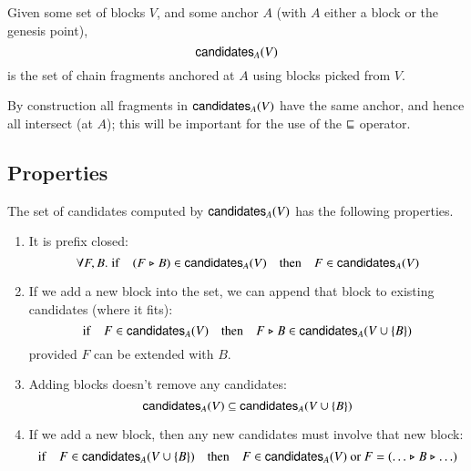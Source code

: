 \begin{definition}
Given some set of blocks $V$, and some anchor $A$ (with $A$ either a block or
the genesis point), $$\mathsf{candidates}_A(V)$$ is the set of chain fragments
anchored at $A$ using blocks picked from $V$.
\end{definition}

By construction all fragments in $\mathsf{candidates}_A(V)$ have the same anchor, and
hence all intersect (at $A$); this will be important for the use of the
$\mathrel{\sqsubseteq}$ operator.

\subsection{Properties}

\begin{lemma}
\label{candidates:properties}
The set of candidates computed by $\mathsf{candidates}_A(V)$ has the following
properties.

\begin{enumerate}

\item \label{candidates:prefixclosed}
It is prefix closed:
\begin{equation*}
\forall F, B .\;
\mathrm{if} \quad (F \mathrel{\triangleright} B) \in \mathsf{candidates}_A(V) \quad \mathrm{then} \quad F \in \mathsf{candidates}_A(V)
\end{equation*}

\item \label{candidates:appendnew}
If we add a new block into the set, we can append that block to existing
candidates (where it fits):
\begin{equation*}
\mathrm{if} \quad F \in \mathsf{candidates}_A(V) \quad \mathrm{then} \quad F \mathrel{\triangleright} B \in \mathsf{candidates}_A(V \cup \{ B \})
\end{equation*}
provided $F$ can be extended with $B$.

\item \label{candidates:monotone}
Adding blocks doesn't remove any candidates:
\begin{equation*}
\mathsf{candidates}_A(V) \subseteq \mathsf{candidates}_A(V \cup \{B\})
\end{equation*}

\item \label{candidates:musthavenew}
If we add a new block, then any new candidates must involve that new block:
\begin{equation*}
\mathrm{if} \quad F \in \mathsf{candidates}_A(V \cup \{B\}) \quad \mathrm{then} \quad F \in \mathsf{candidates}_A(V) \text{ or } F = (\ldots \mathrel{\triangleright} B \mathrel{\triangleright} \ldots)
\end{equation*}

\end{enumerate}
\end{lemma}

